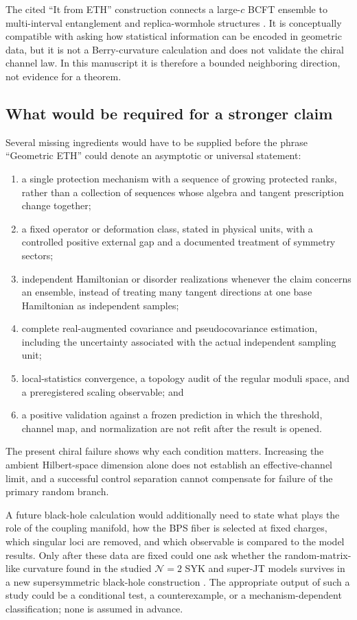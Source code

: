 The cited ``It from ETH'' construction connects a large-$c$ BCFT ensemble to
multi-interval entanglement and replica-wormhole structures
\cite{itfrometh2025}.  It is conceptually compatible with asking how statistical
information can be encoded in geometric data, but it is not a Berry-curvature
calculation and does not validate the chiral channel law.  In this manuscript
it is therefore a bounded neighboring direction, not evidence for a theorem.

\subsection{What would be required for a stronger claim}

Several missing ingredients would have to be supplied before the phrase
``Geometric ETH'' could denote an asymptotic or universal statement:
\begin{enumerate}
  \item a single protection mechanism with a sequence of growing protected
  ranks, rather than a collection of sequences whose algebra and tangent
  prescription change together;
  \item a fixed operator or deformation class, stated in physical units, with
  a controlled positive external gap and a documented treatment of symmetry
  sectors;
  \item independent Hamiltonian or disorder realizations whenever the claim
  concerns an ensemble, instead of treating many tangent directions at one
  base Hamiltonian as independent samples;
  \item complete real-augmented covariance and pseudocovariance estimation,
  including the uncertainty associated with the actual independent sampling
  unit;
  \item local-statistics convergence, a topology audit of the regular moduli
  space, and a preregistered scaling observable; and
  \item a positive validation against a frozen prediction in which the
  threshold, channel map, and normalization are not refit after the result is
  opened.
\end{enumerate}
The present chiral failure shows why each condition matters.  Increasing the
ambient Hilbert-space dimension alone does not establish an effective-channel
limit, and a successful control separation cannot compensate for failure of
the primary random branch.

A future black-hole calculation would additionally need to state what plays
the role of the coupling manifold, how the BPS fiber is selected at fixed
charges, which singular loci are removed, and which observable is compared to
the model results.  Only after these data are fixed could one ask whether the
random-matrix-like curvature found in the studied $\mathcal{N}=2$ SYK and
super-JT models survives in a new supersymmetric black-hole construction
\cite{chen2026berry}.  The appropriate output of such a study could be a
conditional test, a counterexample, or a mechanism-dependent classification;
none is assumed in advance.

